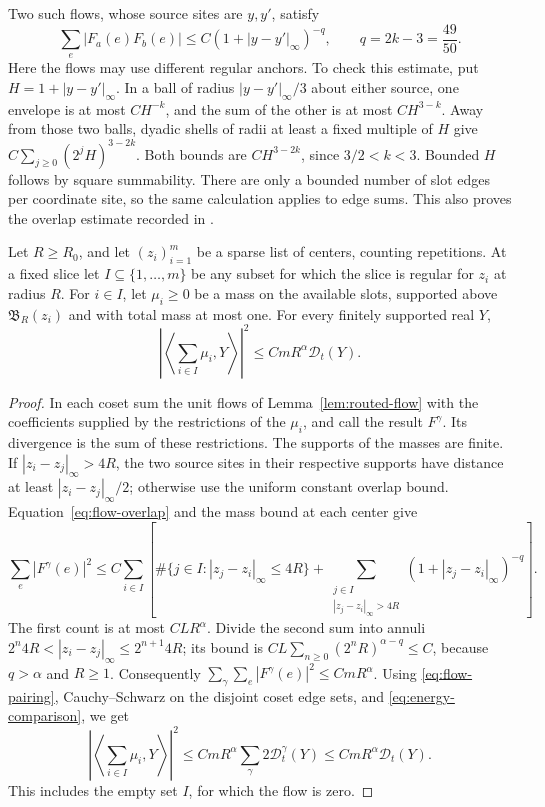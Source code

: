 Two such flows, whose source sites are \(y,y'\), satisfy
\begin{equation}\label{eq:flow-overlap}
 \sum_e|F_a(e)F_b(e)|
 \le C(1+|y-y'|_\infty)^{-q},
 \qquad q=2k-3=\frac{49}{50}.
\end{equation}
Here the flows may use different regular anchors.  To check this estimate,
put \(H=1+|y-y'|_\infty\).  In a ball of radius
\(|y-y'|_\infty/3\) about either source, one envelope is at most
\(CH^{-k}\), and the sum of the other is at most \(CH^{3-k}\).
Away from those two balls, dyadic shells of radii at least a fixed
multiple of \(H\) give \(C\sum_{j\ge0}(2^jH)^{3-2k}\).
Both bounds are \(CH^{3-2k}\), since \(3/2<k<3\).
Bounded \(H\) follows by square summability.  There are only a bounded
number of slot edges per coordinate site, so the same calculation
applies to edge sums.  This also proves the overlap estimate recorded
in \cite[Lemma~6.3]{Ordering}.

\begin{proposition}\label{prop:sparse-energy}
Let \(R\ge R_0\), and let \((z_i)_{i=1}^m\) be a sparse list of
centers, counting repetitions.  At a fixed slice let \(I\subseteq
\{1,\ldots,m\}\) be any subset for which the slice is regular for
\(z_i\) at radius \(R\).  For \(i\in I\), let \(\mu_i\ge0\)
be a mass on the available slots, supported above \(\mathfrak B_R(z_i)\)
and with total mass at most one.  For every finitely supported real \(Y\),
\begin{equation}\label{eq:sparse-source-pairing}
 \left|\left\langle\sum_{i\in I}\mu_i,Y\right\rangle\right|^2
 \le C m R^\alpha\mathcal D_t(Y).
\end{equation}
\end{proposition}

\begin{proof}
In each coset sum the unit flows of Lemma~\ref{lem:routed-flow} with
the coefficients supplied by the restrictions of the \(\mu_i\),
and call the result \(F^\gamma\).  Its divergence is the sum of
these restrictions.  The supports of the masses are finite.
If \(|z_i-z_j|_\infty>4R\), the two source sites in their respective
supports have distance at least \(|z_i-z_j|_\infty/2\); otherwise
use the uniform constant overlap bound.  Equation~\eqref{eq:flow-overlap}
and the mass bound at each center give
\[
 \sum_e|F^\gamma(e)|^2
 \le C\sum_{i\in I}\left[
 \#\{j\in I:|z_j-z_i|_\infty\le4R\}
 +\sum_{\substack{j\in I\\|z_j-z_i|_\infty>4R}}
          (1+|z_j-z_i|_\infty)^{-q}\right].
\]
The first count is at most \(CL R^\alpha\).  Divide the second
sum into annuli \(2^n4R<|z_i-z_j|_\infty\le2^{n+1}4R\);
its bound is
\(CL\sum_{n\ge0}(2^nR)^{\alpha-q}\le C\), because \(q>\alpha\)
and \(R\ge1\).  Consequently
\(\sum_\gamma\sum_e|F^\gamma(e)|^2\le CmR^\alpha\).
Using \eqref{eq:flow-pairing}, Cauchy--Schwarz on the disjoint coset
edge sets, and \eqref{eq:energy-comparison}, we get
\[
 \left|\left\langle\sum_{i\in I}\mu_i,Y\right\rangle\right|^2
 \le CmR^\alpha\sum_\gamma2\mathcal D_t^\gamma(Y)
 \le CmR^\alpha\mathcal D_t(Y).
\]
This includes the empty set \(I\), for which the flow is zero.
\end{proof}

